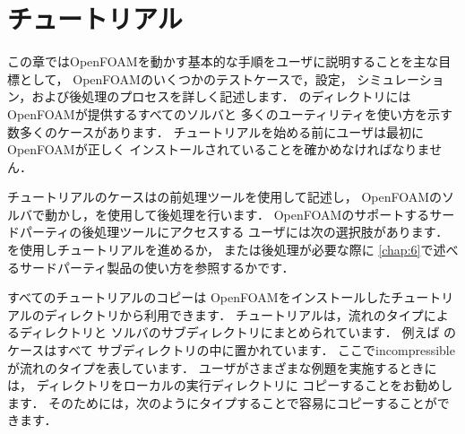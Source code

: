 \chapter{チュートリアル}
\label{chap:2}
この章ではOpenFOAMを動かす基本的な手順をユーザに説明することを主な目標として，
OpenFOAMのいくつかのテストケースで，設定，
シミュレーション，および後処理のプロセスを詳しく記述します．
のディレクトリには
OpenFOAMが提供するすべてのソルバと
多くのユーティリティを使い方を示す数多くのケースがあります．
チュートリアルを始める前にユーザは最初にOpenFOAMが正しく
インストールされていることを確かめなければなりません．

チュートリアルのケースはの前処理ツールを使用して記述し，
OpenFOAMのソルバで動かし，を使用して後処理を行います．
OpenFOAMのサポートするサードパーティの後処理ツールにアクセスする
ユーザには次の選択肢があります．
を使用しチュートリアルを進めるか，
または後処理が必要な際に
\autoref{chap:6}で述べるサードパーティ製品の使い方を参照するかです．

すべてのチュートリアルのコピーは
OpenFOAMをインストールしたチュートリアルのディレクトリから利用できます．
チュートリアルは，流れのタイプによるディレクトリと
ソルバのサブディレクトリにまとめられています．
例えば
%
%
のケースはすべて
サブディレクトリの中に置かれています．
ここでincompressibleが流れのタイプを表しています．
ユーザがさまざまな例題を実施するときには，
%
%
ディレクトリをローカルの実行ディレクトリに
コピーすることをお勧めします．
そのためには，次のようにタイプすることで容易にコピーすることができます．



